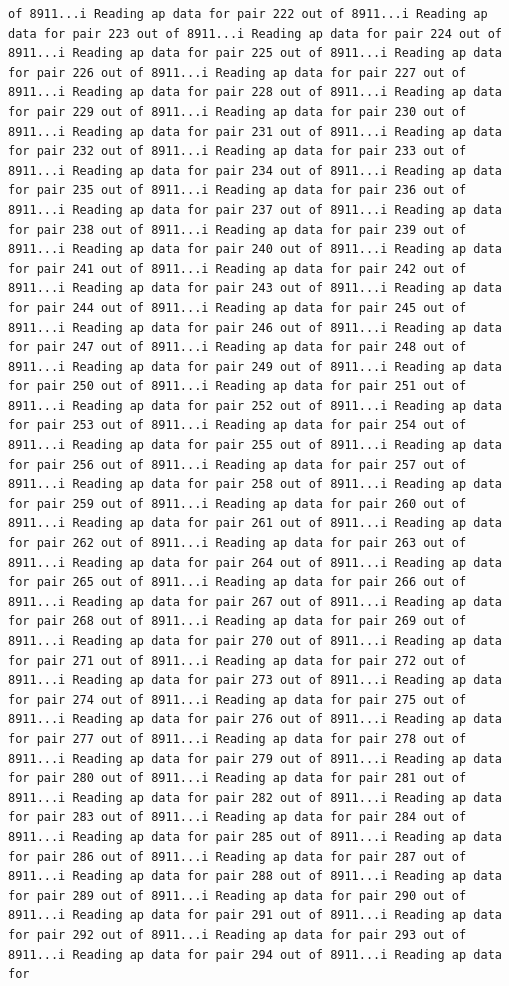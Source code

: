 \documentclass[
]{article}
\begin{document}
\begin{verbatim}
of 8911...i Reading ap data for pair 222 out of 8911...i Reading ap data for pair 223 out of 8911...i Reading ap data for pair 224 out of 8911...i Reading ap data for pair 225 out of 8911...i Reading ap data for pair 226 out of 8911...i Reading ap data for pair 227 out of 8911...i Reading ap data for pair 228 out of 8911...i Reading ap data for pair 229 out of 8911...i Reading ap data for pair 230 out of 8911...i Reading ap data for pair 231 out of 8911...i Reading ap data for pair 232 out of 8911...i Reading ap data for pair 233 out of 8911...i Reading ap data for pair 234 out of 8911...i Reading ap data for pair 235 out of 8911...i Reading ap data for pair 236 out of 8911...i Reading ap data for pair 237 out of 8911...i Reading ap data for pair 238 out of 8911...i Reading ap data for pair 239 out of 8911...i Reading ap data for pair 240 out of 8911...i Reading ap data for pair 241 out of 8911...i Reading ap data for pair 242 out of 8911...i Reading ap data for pair 243 out of 8911...i Reading ap data for pair 244 out of 8911...i Reading ap data for pair 245 out of 8911...i Reading ap data for pair 246 out of 8911...i Reading ap data for pair 247 out of 8911...i Reading ap data for pair 248 out of 8911...i Reading ap data for pair 249 out of 8911...i Reading ap data for pair 250 out of 8911...i Reading ap data for pair 251 out of 8911...i Reading ap data for pair 252 out of 8911...i Reading ap data for pair 253 out of 8911...i Reading ap data for pair 254 out of 8911...i Reading ap data for pair 255 out of 8911...i Reading ap data for pair 256 out of 8911...i Reading ap data for pair 257 out of 8911...i Reading ap data for pair 258 out of 8911...i Reading ap data for pair 259 out of 8911...i Reading ap data for pair 260 out of 8911...i Reading ap data for pair 261 out of 8911...i Reading ap data for pair 262 out of 8911...i Reading ap data for pair 263 out of 8911...i Reading ap data for pair 264 out of 8911...i Reading ap data for pair 265 out of 8911...i Reading ap data for pair 266 out of 8911...i Reading ap data for pair 267 out of 8911...i Reading ap data for pair 268 out of 8911...i Reading ap data for pair 269 out of 8911...i Reading ap data for pair 270 out of 8911...i Reading ap data for pair 271 out of 8911...i Reading ap data for pair 272 out of 8911...i Reading ap data for pair 273 out of 8911...i Reading ap data for pair 274 out of 8911...i Reading ap data for pair 275 out of 8911...i Reading ap data for pair 276 out of 8911...i Reading ap data for pair 277 out of 8911...i Reading ap data for pair 278 out of 8911...i Reading ap data for pair 279 out of 8911...i Reading ap data for pair 280 out of 8911...i Reading ap data for pair 281 out of 8911...i Reading ap data for pair 282 out of 8911...i Reading ap data for pair 283 out of 8911...i Reading ap data for pair 284 out of 8911...i Reading ap data for pair 285 out of 8911...i Reading ap data for pair 286 out of 8911...i Reading ap data for pair 287 out of 8911...i Reading ap data for pair 288 out of 8911...i Reading ap data for pair 289 out of 8911...i Reading ap data for pair 290 out of 8911...i Reading ap data for pair 291 out of 8911...i Reading ap data for pair 292 out of 8911...i Reading ap data for pair 293 out of 8911...i Reading ap data for pair 294 out of 8911...i Reading ap data for 
\end{verbatim}
\end{document}
